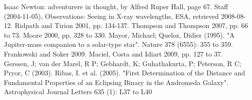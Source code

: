 \documentclass{article}
\begin{document}
\begin{thebibliography}{9}

Isaac Newton: adventurere in thought, by Alfred Ruper Hall, page 67.
Staff (2004-11-05), Observations: Seeing in X-ray wavelengths, ESA, retrieved 2008-08-12.
Ridpath and Tirion 2001, pp. 134-137.
Thompson and Thompson 2007, pp. 66 to 73.
Moore 2000, pp. 328 to 330.
Mayor, Michael; Queloz, Didier (1995). "A Jupiter-mass companion to a solar-type star". Nature 378 (6555): 355 to 359.
Frankowski and Soker 2009.
Maciel, Costa and Idiart 2009, pp. 127 to 37.
Gerssen, J; van der Marel, R P; Gebhardt, K; Guhathakurta, P; Peterson, R C; Pryor, C (2003).
Ribas, I. et al. (2005). "First Determination of the Distance and Fundamental Properties of an Eclipsing Binary in the Andromeda Galaxy". Astrophysical Journal Letters 635 (1): L37 to L40

\end{thebibliography}
\end{document}
